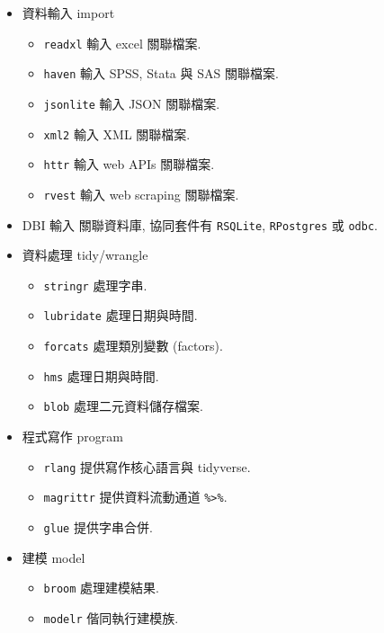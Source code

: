 \documentclass[
]{book}
\providecommand{\tightlist}{%
  \setlength{\itemsep}{0pt}\setlength{\parskip}{0pt}}
\begin{document}
\begin{itemize}
\tightlist
\item
  資料輸入 import

  \begin{itemize}
  \tightlist
  \item
    \texttt{readxl} 輸入 excel 關聯檔案.\\
  \item
    \texttt{haven} 輸入 SPSS, Stata 與 SAS 關聯檔案.
  \item
    \texttt{jsonlite} 輸入 JSON 關聯檔案.
  \item
    \texttt{xml2} 輸入 XML 關聯檔案.
  \item
    \texttt{httr} 輸入 web APIs 關聯檔案.
  \item
    \texttt{rvest} 輸入 web scraping 關聯檔案.
  \end{itemize}
\item
  DBI 輸入 關聯資料庫, 協同套件有 \texttt{RSQLite}, \texttt{RPostgres} 或 \texttt{odbc}.
\item
  資料處理 tidy/wrangle

  \begin{itemize}
  \tightlist
  \item
    \texttt{stringr} 處理字串.
  \item
    \texttt{lubridate} 處理日期與時間.
  \item
    \texttt{forcats} 處理類別變數 (factors).
  \item
    \texttt{hms} 處理日期與時間.
  \item
    \texttt{blob} 處理二元資料儲存檔案.
  \end{itemize}
\item
  程式寫作 program

  \begin{itemize}
  \tightlist
  \item
    \texttt{rlang} 提供寫作核心語言與 tidyverse.
  \item
    \texttt{magrittr} 提供資料流動通道 \texttt{\%\textgreater{}\%}.
  \item
    \texttt{glue} 提供字串合併.
  \end{itemize}
\item
  建模 model

  \begin{itemize}
  \tightlist
  \item
    \texttt{broom} 處理建模結果.
  \item
    \texttt{modelr} 偕同執行建模族.
  \end{itemize}
\end{itemize}
\end{document}
